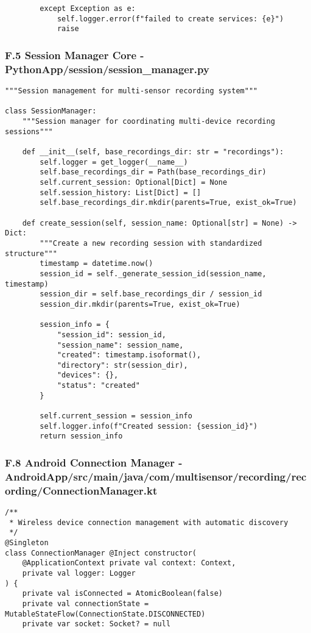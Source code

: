\documentclass[12pt,a4paper]{article}
\begin{document}
{{\begin{verbatim}
        except Exception as e:
            self.logger.error(f"failed to create services: {e}")
            raise
\end{verbatim}

\subsubsection{F.5 Session Manager Core - PythonApp/session/session_manager.py}

\begin{verbatim}
"""Session management for multi-sensor recording system"""

class SessionManager:
    """Session manager for coordinating multi-device recording sessions"""
    
    def __init__(self, base_recordings_dir: str = "recordings"):
        self.logger = get_logger(__name__)
        self.base_recordings_dir = Path(base_recordings_dir)
        self.current_session: Optional[Dict] = None
        self.session_history: List[Dict] = []
        self.base_recordings_dir.mkdir(parents=True, exist_ok=True)
    
    def create_session(self, session_name: Optional[str] = None) -> Dict:
        """Create a new recording session with standardized structure"""
        timestamp = datetime.now()
        session_id = self._generate_session_id(session_name, timestamp)
        session_dir = self.base_recordings_dir / session_id
        session_dir.mkdir(parents=True, exist_ok=True)
        
        session_info = {
            "session_id": session_id,
            "session_name": session_name,
            "created": timestamp.isoformat(),
            "directory": str(session_dir),
            "devices": {},
            "status": "created"
        }
        
        self.current_session = session_info
        self.logger.info(f"Created session: {session_id}")
        return session_info
\end{verbatim}

\subsubsection{F.8 Android Connection Manager - AndroidApp/src/main/java/com/multisensor/recording/recording/ConnectionManager.kt}

\begin{verbatim}
/**
 * Wireless device connection management with automatic discovery
 */
@Singleton
class ConnectionManager @Inject constructor(
    @ApplicationContext private val context: Context,
    private val logger: Logger
) {
    private val isConnected = AtomicBoolean(false)
    private val connectionState = MutableStateFlow(ConnectionState.DISCONNECTED)
    private var socket: Socket? = null
    

\end{verbatim}}}
\end{document}
